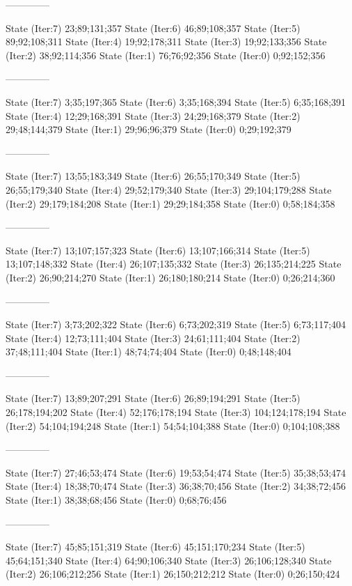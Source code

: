 \documentclass[a4paper,10pt,ngerman]{scrartcl}
\begin{document}
\begin{lstcs}
--------------

State (Iter:7) {23;89;131;357}
State (Iter:6) {46;89;108;357}
State (Iter:5) {89;92;108;311}
State (Iter:4) {19;92;178;311}
State (Iter:3) {19;92;133;356}
State (Iter:2) {38;92;114;356}
State (Iter:1) {76;76;92;356}
State (Iter:0) {0;92;152;356}

--------------

State (Iter:7) {3;35;197;365}
State (Iter:6) {3;35;168;394}
State (Iter:5) {6;35;168;391}
State (Iter:4) {12;29;168;391}
State (Iter:3) {24;29;168;379}
State (Iter:2) {29;48;144;379}
State (Iter:1) {29;96;96;379}
State (Iter:0) {0;29;192;379}

--------------

State (Iter:7) {13;55;183;349}
State (Iter:6) {26;55;170;349}
State (Iter:5) {26;55;179;340}
State (Iter:4) {29;52;179;340}
State (Iter:3) {29;104;179;288}
State (Iter:2) {29;179;184;208}
State (Iter:1) {29;29;184;358}
State (Iter:0) {0;58;184;358}

--------------

State (Iter:7) {13;107;157;323}
State (Iter:6) {13;107;166;314}
State (Iter:5) {13;107;148;332}
State (Iter:4) {26;107;135;332}
State (Iter:3) {26;135;214;225}
State (Iter:2) {26;90;214;270}
State (Iter:1) {26;180;180;214}
State (Iter:0) {0;26;214;360}

--------------

State (Iter:7) {3;73;202;322}
State (Iter:6) {6;73;202;319}
State (Iter:5) {6;73;117;404}
State (Iter:4) {12;73;111;404}
State (Iter:3) {24;61;111;404}
State (Iter:2) {37;48;111;404}
State (Iter:1) {48;74;74;404}
State (Iter:0) {0;48;148;404}

--------------

State (Iter:7) {13;89;207;291}
State (Iter:6) {26;89;194;291}
State (Iter:5) {26;178;194;202}
State (Iter:4) {52;176;178;194}
State (Iter:3) {104;124;178;194}
State (Iter:2) {54;104;194;248}
State (Iter:1) {54;54;104;388}
State (Iter:0) {0;104;108;388}

--------------

State (Iter:7) {27;46;53;474}
State (Iter:6) {19;53;54;474}
State (Iter:5) {35;38;53;474}
State (Iter:4) {18;38;70;474}
State (Iter:3) {36;38;70;456}
State (Iter:2) {34;38;72;456}
State (Iter:1) {38;38;68;456}
State (Iter:0) {0;68;76;456}

--------------

State (Iter:7) {45;85;151;319}
State (Iter:6) {45;151;170;234}
State (Iter:5) {45;64;151;340}
State (Iter:4) {64;90;106;340}
State (Iter:3) {26;106;128;340}
State (Iter:2) {26;106;212;256}
State (Iter:1) {26;150;212;212}
State (Iter:0) {0;26;150;424}


\end{lstcs}
\end{document}
